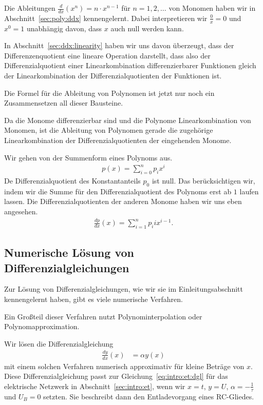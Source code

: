 \documentclass{article}
\def\ddx#1{\frac{d#1}{dx}}
\begin{document}
Die Ableitungen $\ddx{}\left(x^n\right) = n\cdot x^{n-1}$ für
$n=1,2,\ldots$ von Monomen haben wir in Abschnitt~\ref{sec:poly:ddx}
kennengelernt. Dabei interpretieren wir $\frac{0}{x}=0$ und $x^0 = 1$
unabhängig davon, dass $x$ auch null werden kann.

In Abschnitt~\ref{sec:ddx:linearity} haben wir uns davon überzeugt,
dass der Differenzenquotient eine lineare Operation darstellt, dass
also der Differenzialquotient einer Linearkombination
differenzierbarer Funktionen gleich der Linearkombination der
Differenzialquotienten der Funktionen ist.

Die Formel für die Ableitung von Polynomen ist jetzt nur noch ein
Zusammensetzen all dieser Bausteine.

Da die Monome differenzierbar sind und die Polynome Linearkombination
von Monomen, ist die Ableitung von Polynomen gerade die zugehörige
Linearkombination der Differenzialquotienten der eingehenden Monome.

Wir gehen von der Summenform eines Polynoms aus.
\begin{align*}
  p(x) = \sum_{i=0}^n p_i x^i
\end{align*}
De Differenzialquotient des Konstantanteils $p_0$ ist null. Das
berücksichtigen wir, indem wir die Summe für den Differenzialquotient
des Polynoms erst ab $1$ laufen lassen. Die Differenzialquotienten der
anderen Monome haben wir uns eben angesehen.
\begin{align*}
  \ddx p(x) = \sum_{i=1}^n p_i i x^{i-1}.
\end{align*}
\subsection{Numerische Lösung von Differenzialgleichungen}
\label{sec:numODE}
Zur Lösung von Differenzialgleichungen, wie wir sie im
Einleitungsabschnitt kennengelernt haben, gibt es viele numerische
Verfahren.

Ein Großteil dieser Verfahren nutzt Polynominterpolation oder
Polynomapproximation.

Wir lösen die Differenzialgleichung
\begin{align}
  \ddx y(x) &= \alpha y(x)
              \label{eq:numODE:example}
\end{align}
mit einem solchen Verfahren numerisch approximativ für kleine Beträge
von $x$.  Diese Differenzialgleichung passt zur
Gleichung~\eqref{eq:intro:et:dgl} für das elektrische Netzwerk in
Abschnitt~\ref{sec:intro:et}, wenn wir $x=t$, $y=U$,
$\alpha=-\frac1\tau$ und $U_B=0$ setzten. Sie beschreibt dann den
Entladevorgang eines RC-Gliedes.
\end{document}
